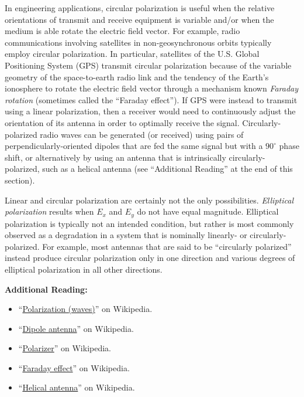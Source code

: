 In engineering applications, circular polarization is useful when the relative orientations of transmit and receive equipment is variable and/or when the medium is able rotate the electric field vector.  For example, radio communications involving satellites in non-geosynchronous orbits typically employ circular polarization.
In particular, satellites of the U.S. Global Positioning System (GPS) 
transmit circular polarization because of the variable geometry of the space-to-earth radio link and the tendency of the Earth's ionosphere to rotate the electric field vector through a mechanism known \emph{Faraday rotation} 
(sometimes called the ``Faraday effect'').
If GPS were instead to transmit using a linear polarization, then a receiver would need to continuously adjust the orientation of its antenna in order to optimally receive the signal.   
Circularly-polarized radio waves can be generated (or received) using pairs of perpendicularly-oriented dipoles that are fed the same signal but with a $90^{\circ}$ phase shift, or alternatively by using an antenna that is intrinsically circularly-polarized, such as a helical antenna 
(see ``Additional Reading'' at the end of this section). 

Linear and circular polarization are certainly not the only possibilities.
\emph{Elliptical polarization} 
results when $E_x$ and $E_y$ do not have equal magnitude.
Elliptical polarization is typically not an intended condition, but rather is most commonly observed as a degradation in a system that is nominally linearly- or circularly-polarized.  For example, most antennas that are said to be ``circularly polarized'' instead produce circular polarization only in one direction and various degrees of elliptical polarization in all other directions.   

{\bf Additional Reading:}
\begin{itemize}
\item ``\href{https://en.wikipedia.org/wiki/Polarization_(waves)}{Polarization (waves)}'' on Wikipedia.
\item ``\href{https://en.wikipedia.org/wiki/Dipole_antenna}{Dipole antenna}'' on Wikipedia.
\item ``\href{https://en.wikipedia.org/wiki/Polarizer}{Polarizer}'' on Wikipedia.
\item ``\href{https://en.wikipedia.org/wiki/Faraday_effect}{Faraday effect}'' on Wikipedia.
\item ``\href{https://en.wikipedia.org/wiki/Helical_antenna}{Helical antenna}'' on Wikipedia.
\end{itemize}

